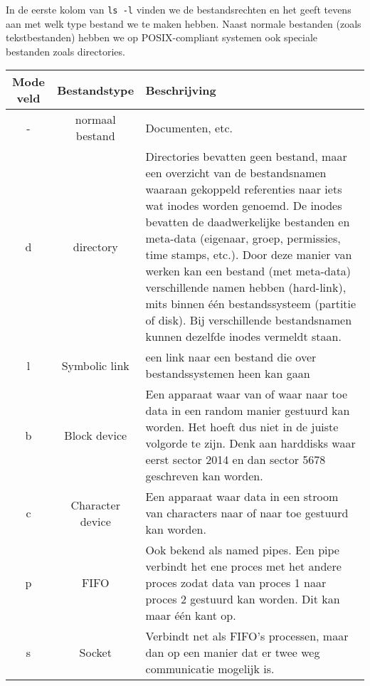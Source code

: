 In de eerste kolom van \texttt{ls -l} vinden we de bestandsrechten en het geeft tevens aan met welk type bestand we te maken hebben. Naast normale bestanden (zoals tekstbestanden) hebben we op POSIX-compliant systemen ook speciale bestanden zoals directories.

\begin{tabularx}{5in}{ |c|c|X| }
\hline
	Mode veld & Bestandstype & Beschrijving \\
\hline
\hline
	- & normaal bestand & Documenten, etc. \\
\hline
	d & directory & Directories bevatten geen bestand, maar een overzicht van de bestandsnamen waaraan gekoppeld referenties naar iets wat inodes worden genoemd. De inodes bevatten de daadwerkelijke bestanden en meta-data (eigenaar, groep, permissies, time stamps, etc.). Door deze manier van werken kan een bestand (met meta-data) verschillende namen hebben (hard-link), mits binnen \'e\'en bestandssysteem (partitie of disk). Bij verschillende bestandsnamen kunnen dezelfde inodes vermeldt staan. \\
\hline
	l & Symbolic link & een link naar een bestand die over bestandssystemen heen kan gaan \\
\hline
	b & Block device & Een apparaat waar van of waar naar toe data in een random manier gestuurd kan worden. Het hoeft dus niet in de juiste volgorde te zijn. Denk aan harddisks waar eerst sector 2014 en dan sector 5678 geschreven kan worden. \\
\hline
	c & Character device & Een apparaat waar data in een stroom van characters naar of naar toe gestuurd kan worden. \\
\hline
	p & FIFO & Ook bekend als named pipes. Een pipe verbindt het ene proces met het andere proces zodat data van proces 1 naar proces 2 gestuurd kan worden. Dit kan maar \'e\'en kant op. \\
\hline
	s & Socket & Verbindt net als FIFO's processen, maar dan op een manier dat er twee weg communicatie mogelijk is. \\
\hline
\end{tabularx}

